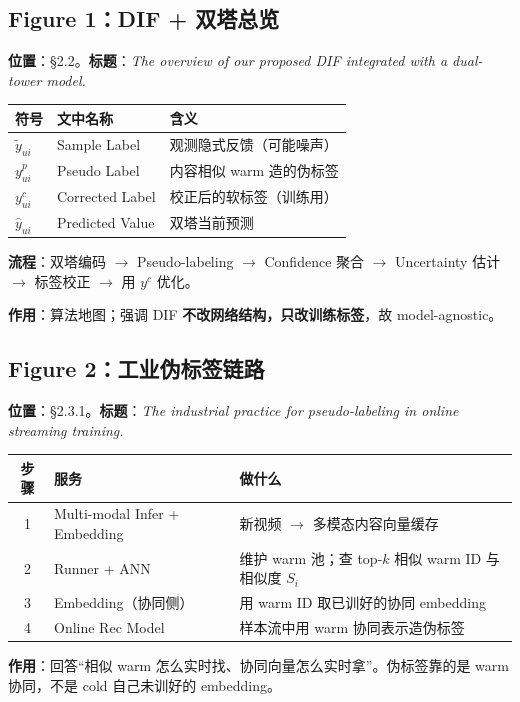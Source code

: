 \documentclass[11pt,a4paper]{ctexart}
\begin{document}
\subsection{Figure 1：DIF + 双塔总览}
\textbf{位置}：§2.2。\textbf{标题}：\textit{The overview of our proposed DIF integrated with a dual-tower model.}

\begin{center}
\small
\begin{tabular}{lll}
\toprule
符号 & 文中名称 & 含义 \\
\midrule
$\tilde{y}_{ui}$ & Sample Label & 观测隐式反馈（可能噪声） \\
$y^{p}_{ui}$ & Pseudo Label & 内容相似 warm 造的伪标签 \\
$y^{c}_{ui}$ & Corrected Label & 校正后的软标签（训练用） \\
$\hat{y}_{ui}$ & Predicted Value & 双塔当前预测 \\
\bottomrule
\end{tabular}
\end{center}

\textbf{流程}：双塔编码 $\to$ Pseudo-labeling $\to$ Confidence 聚合 $\to$ Uncertainty 估计 $\to$ 标签校正 $\to$ 用 $y^{c}$ 优化。

\textbf{作用}：算法地图；强调 DIF \textbf{不改网络结构，只改训练标签}，故 model-agnostic。

\subsection{Figure 2：工业伪标签链路}
\textbf{位置}：§2.3.1。\textbf{标题}：\textit{The industrial practice for pseudo-labeling in online streaming training.}

\begin{center}
\small
\begin{tabular}{clp{9cm}}
\toprule
步骤 & 服务 & 做什么 \\
\midrule
1 & Multi-modal Infer + Embedding & 新视频 $\to$ 多模态内容向量缓存 \\
2 & Runner + ANN & 维护 warm 池；查 top-$k$ 相似 warm ID 与相似度 $S_i$ \\
3 & Embedding（协同侧） & 用 warm ID 取已训好的协同 embedding \\
4 & Online Rec Model & 样本流中用 warm 协同表示造伪标签 \\
\bottomrule
\end{tabular}
\end{center}

\textbf{作用}：回答“相似 warm 怎么实时找、协同向量怎么实时拿”。伪标签靠的是 warm 协同，不是 cold 自己未训好的 embedding。
\end{document}
